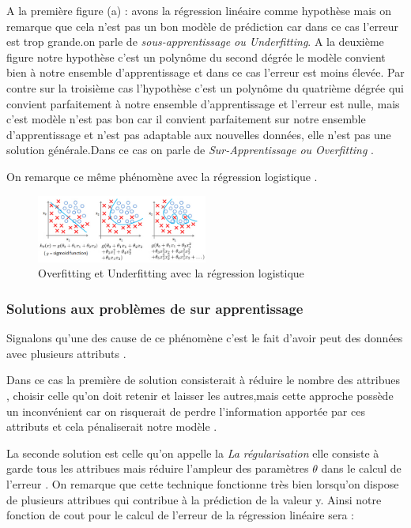 A la première figure (a) : avons la régression linéaire comme hypothèse  mais on remarque que cela n'est pas un bon modèle de prédiction car dans ce cas l'erreur est trop grande.on parle de \emph{sous-apprentissage ou Underfitting}.
A la deuxième figure notre hypothèse c'est un polynôme du second dégrée le modèle convient bien à notre ensemble d'apprentissage et dans ce cas l'erreur est moins élevée.
Par contre sur la troisième cas l'hypothèse c'est un polynôme du quatrième dégrée qui convient parfaitement à notre ensemble d'apprentissage et l'erreur est nulle, mais c'est modèle n'est pas bon  car il  convient parfaitement sur notre ensemble d'apprentissage et n'est pas adaptable aux nouvelles données, elle n'est pas une solution générale.Dans ce cas on parle de \emph{Sur-Apprentissage ou Overfitting } .

On remarque ce même phénomène avec la régression logistique .

\begin{figure}[ht]
	\centering
	\includegraphics[width=0.5\textwidth]{fig/OverfiittingLogistic.png}
	\caption{Overfitting et Underfitting avec la régression logistique }
	\label{fig:image8}
\end{figure}
\subsubsection{Solutions aux problèmes de sur apprentissage }
Signalons qu'une des cause de ce phénomène c'est le fait d'avoir peut des données avec plusieurs attributs .

Dans ce cas la première de solution consisterait à réduire le nombre des attribues , choisir celle qu'on doit retenir et laisser les autres,mais cette approche possède un inconvénient car on risquerait de perdre l'information apportée par ces attributs et cela pénaliserait notre modèle .

La seconde solution est celle qu'on appelle la \emph{La régularisation } elle consiste à garde tous les attribues mais réduire l'ampleur des paramètres  $\theta$ dans le calcul de l'erreur . On remarque que cette technique fonctionne très bien lorsqu'on dispose de plusieurs attribues qui contribue à la prédiction de la valeur y.
Ainsi notre fonction de cout pour le calcul de l'erreur de la régression linéaire sera :


